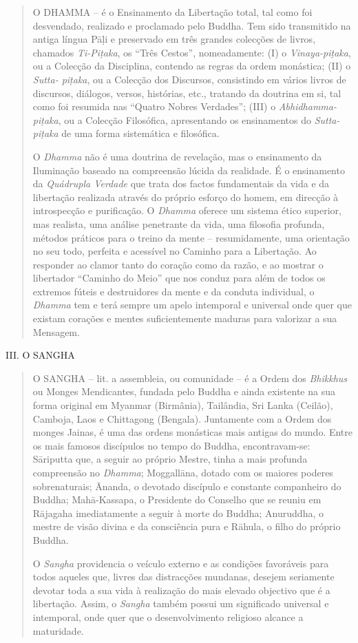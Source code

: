 \begin{quote}
O DHAMMA -- é o Ensinamento da Libertação total, tal como foi desvendado, realizado e proclamado pelo Buddha. Tem sido transmitido na antiga língua Pāḷi e preservado em três grandes colecções de livros, chamados \emph{Ti-Piṭaka}, os ``Três Cestos'', nomeadamente: (I) o \emph{Vinaya-piṭaka}, ou a Colecção da Disciplina, contendo as regras da ordem monástica; (II) o \emph{Sutta- piṭaka}, ou a Colecção dos Discursos, consistindo em vários livros de discursos, diálogos, versos, histórias, etc., tratando da doutrina em si, tal como foi resumida nas ``Quatro Nobres Verdades''; (III) o \emph{Abhidhamma-piṭaka}, ou a Colecção Filosófica, apresentando os ensinamentos do \emph{Sutta-piṭaka} de uma forma sistemática e filosófica.

O \emph{Dhamma} não é uma doutrina de revelação, mas o ensinamento da Iluminação baseado na compreensão lúcida da realidade. É o ensinamento da \emph{Quádrupla Verdade} que trata dos factos fundamentais da vida e da libertação realizada através do próprio esforço do homem, em direcção à introspecção e purificação. O \emph{Dhamma} oferece um sistema ético superior, mas realista, uma análise penetrante da vida, uma filosofia profunda, métodos práticos para o treino da mente -- resumidamente, uma orientação no seu todo, perfeita e acessível no Caminho para a Libertação. Ao responder ao clamor tanto do coração como da razão, e ao mostrar o libertador ``Caminho do Meio'' que nos conduz para além de todos os extremos fúteis e destruidores da mente e da conduta individual, o \emph{Dhamma} tem e terá sempre um apelo intemporal e universal onde quer que existam corações e mentes suficientemente maduras para valorizar a sua Mensagem.
\end{quote}

III. O SANGHA

\begin{quote}
O SANGHA -- lit. a assembleia, ou comunidade -- é a Ordem dos \emph{Bhikkhus} ou Monges Mendicantes, fundada pelo Buddha e ainda existente na sua forma original em Myanmar (Birmânia), Tailândia, Sri Lanka (Ceilão), Camboja, Laos e Chittagong (Bengala). Juntamente com a Ordem dos monges Jainas, é uma das ordens monásticas mais antigas do mundo. Entre os mais famosos discípulos no tempo do Buddha, encontravam-se: Sāriputta que, a seguir ao próprio Mestre, tinha a mais profunda compreensão no \emph{Dhamma}; Moggallāna, dotado com os maiores poderes sobrenaturais; Ānanda, o devotado discípulo e constante companheiro do Buddha; Mahā-Kassapa, o Presidente do Conselho que se reuniu em Rājagaha imediatamente a seguir à morte do Buddha; Anuruddha, o mestre de visão divina e da consciência pura e Rāhula, o filho do próprio Buddha.

O \emph{Sangha} providencia o veículo externo e as condições favoráveis para todos aqueles que, livres das distracções mundanas, desejem seriamente devotar toda a sua vida à realização do mais elevado objectivo que é a libertação. Assim, o \emph{Sangha} também possui um significado universal e intemporal, onde quer que o desenvolvimento religioso alcance a maturidade.
\end{quote}

